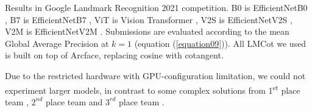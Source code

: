 \begin{table}[htpb]
\begin{threeparttable}
    \begin{tablenotes}
      \small
      \item Results in Google Landmark Recognition 2021 competition. B0 is EfficientNetB0 \cite{tan2019efficientnet}, B7 is EfficientNetB7 \cite{tan2019efficientnet}, ViT is Vision Transformer \cite{dosovitskiy2020image}, V2S is EfficientNetV2S \cite{tan2021efficientnetv2}, V2M is EfficientNetV2M \cite{tan2021efficientnetv2}. Submissions are evaluated according to the mean Global Average Precision at $k=1$ (equation (\ref{equation09})). All LMCot we used is built on top of Arcface, replacing cosine with cotangent.
    \end{tablenotes}
\end{threeparttable}
\end{table}

Due to the restricted hardware with GPU-configuration limitation, we could not experiment larger models, in contrast to some complex solutions from 1\textsuperscript{st} place team \cite{henkel2021efficient}, $2^{nd}$ place team \cite{shubin20212nd} and $3^{rd}$ place team \cite{xu20213rd}.